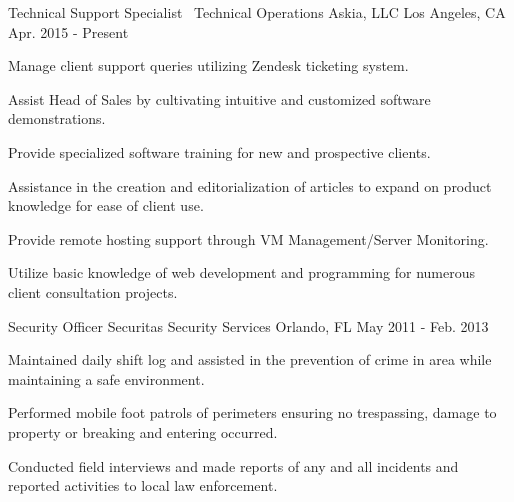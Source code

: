 


\begin{cventries}


\cventry
{Technical Support Specialist \ Technical Operations} %
{Askia, LLC} %
{Los Angeles, CA} %
{Apr. 2015 - Present} %
{ %
\begin{cvitems}
\item {Manage client support queries utilizing Zendesk ticketing system.}
\item {Assist Head of Sales by cultivating intuitive and customized software demonstrations.}
\item {Provide specialized software training for new and prospective clients.}
\item {Assistance in the creation and editorialization of articles to expand on product knowledge for ease of client use.}
\item {Provide remote hosting support through VM Management/Server Monitoring.}
\item {Utilize basic knowledge of web development and programming for numerous client consultation projects.}
\end{cvitems}
}


\cventry
{Security Officer} %
{Securitas Security Services} %
{Orlando, FL} %
{May 2011 - Feb. 2013} %
{ %
\begin{cvitems}
\item {Maintained daily shift log and assisted in the prevention of crime in area while maintaining a safe environment.}
\item {Performed mobile foot patrols of perimeters ensuring no trespassing, damage to property or breaking and entering occurred.}
\item {Conducted field interviews and made reports of any and all incidents and reported activities to local law enforcement.}
\end{cvitems}
}

\end{cventries}